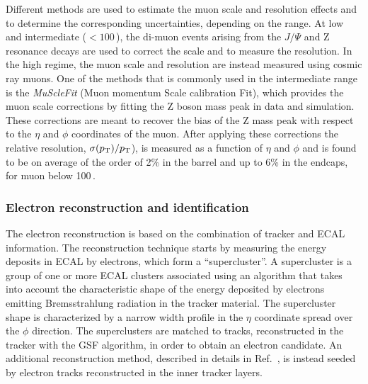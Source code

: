 Different methods are used to estimate the muon \pt scale and resolution effects and to determine the corresponding uncertainties, depending on the \pt range. At low and intermediate \pt ($< 100$\,\GeV), the di-muon events arising from the $J/\Psi$ and Z resonance decays are used to correct the \pt scale and to measure the \pt resolution. In the high \pt regime, the muon \pt scale and resolution are instead measured using cosmic ray muons. One of the methods that is commonly used in the intermediate \pt range is the \emph{MuScleFit} (Muon momentum Scale calibration Fit), which provides the muon \pt scale corrections by fitting the Z boson mass peak in data and simulation. These corrections are meant to recover the bias of the Z mass peak with respect to the $\eta$ and $\phi$ coordinates of the muon. After applying these corrections the relative \pt resolution, $\sigma(p_\mathrm{T})/p_\mathrm{T}$), is measured as a function of $\eta$ and $\phi$ and is found to be on average of the order of 2\% in the barrel and up to 6\% in the endcaps, for muon \pt below 100\,\GeV.

\subsubsection{Electron reconstruction and identification}

The electron reconstruction is based on the combination of tracker and ECAL information. The reconstruction technique starts by measuring the energy deposits in ECAL by electrons, which form a ``supercluster''. A supercluster is a group of one or more ECAL clusters associated using an algorithm that takes into account the characteristic shape of the energy deposited by electrons emitting Bremsstrahlung radiation in the tracker material. The supercluster shape is characterized by a narrow width profile in the $\eta$ coordinate spread over the $\phi$ direction. The superclusters are matched to tracks, reconstructed in the tracker with the GSF algorithm, in order to obtain an electron candidate. An additional reconstruction method, described in details in Ref.~\cite{CMS-PAS-EGM-10-004}, is instead seeded by electron tracks reconstructed in the inner tracker layers.

